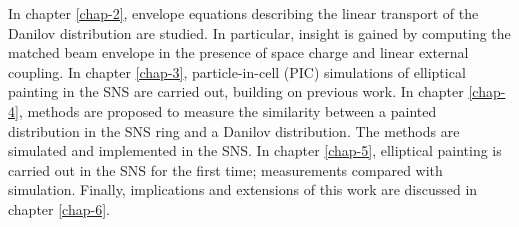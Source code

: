 In chapter \ref{chap-2}, envelope equations describing the linear transport of the Danilov distribution are studied. In particular, insight is gained by computing the matched beam envelope in the presence of space charge and linear external coupling. In chapter \ref{chap-3}, particle-in-cell (PIC) simulations of elliptical painting in the SNS are carried out, building on previous work. In chapter \ref{chap-4}, methods are proposed to measure the similarity between a painted distribution in the SNS ring and a Danilov distribution. The methods are simulated and implemented in the SNS. In chapter \ref{chap-5}, elliptical painting is carried out in the SNS for the first time; measurements compared with simulation. Finally, implications and extensions of this work are discussed in chapter \ref{chap-6}.











































































































